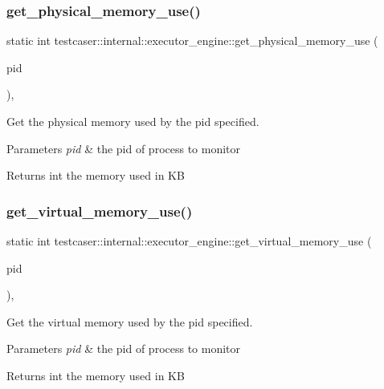\subsubsection{\texorpdfstring{get\_physical\_memory\_use()}{get\_physical\_memory\_use()}}
{\footnotesize\ttfamily static int testcaser\+::internal\+::executor\+\_\+engine\+::get\+\_\+physical\+\_\+memory\+\_\+use (\begin{DoxyParamCaption}\item[{pid\+\_\+t}]{pid }\end{DoxyParamCaption})\hspace{0.3cm}{\ttfamily [inline]}, {\ttfamily [static]}}



Get the physical memory used by the pid specified. 


\begin{DoxyParams}{Parameters}
{\em pid} & the pid of process to monitor \\
\hline
\end{DoxyParams}
\begin{DoxyReturn}{Returns}
int the memory used in KB 
\end{DoxyReturn}
\mbox{\label{structtestcaser_1_1internal_1_1executor__engine_ab70c6b9356bc0dbaf138aa017b048e8a}} 
\subsubsection{\texorpdfstring{get\_virtual\_memory\_use()}{get\_virtual\_memory\_use()}}
{\footnotesize\ttfamily static int testcaser\+::internal\+::executor\+\_\+engine\+::get\+\_\+virtual\+\_\+memory\+\_\+use (\begin{DoxyParamCaption}\item[{pid\+\_\+t}]{pid }\end{DoxyParamCaption})\hspace{0.3cm}{\ttfamily [inline]}, {\ttfamily [static]}}



Get the virtual memory used by the pid specified. 


\begin{DoxyParams}{Parameters}
{\em pid} & the pid of process to monitor \\
\hline
\end{DoxyParams}
\begin{DoxyReturn}{Returns}
int the memory used in KB 
\end{DoxyReturn}
\mbox{\label{structtestcaser_1_1internal_1_1executor__engine_ac4add5efeeecea04a65f06c5f32f62fe}} 
